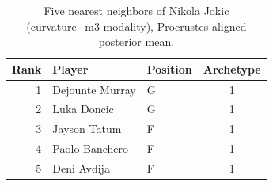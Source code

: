 \begin{table}[htbp]
  \centering\small
  \begin{tabular}{rllc}
    \toprule
    Rank & Player & Position & Archetype \\
    \midrule
    1 & Dejounte Murray & G & 1 \\
    2 & Luka Doncic & G & 1 \\
    3 & Jayson Tatum & F & 1 \\
    4 & Paolo Banchero & F & 1 \\
    5 & Deni Avdija & F & 1 \\
    \bottomrule
  \end{tabular}
  \caption{Five nearest neighbors of Nikola Jokic (curvature_m3 modality), Procrustes-aligned posterior mean.}
  \label{tab:Nikola_Jokic_neighbors_curvature_m3}
\end{table}

